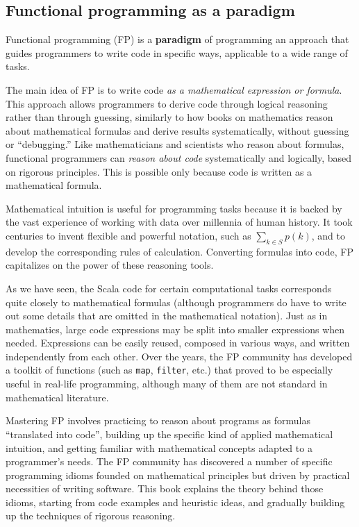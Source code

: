 \subsection{Functional programming as a paradigm}

Functional programming (FP)
is a \textbf{paradigm} of programming
\textemdash{} an approach that guides programmers to write code in
specific ways, applicable to a wide range of tasks.

The main idea of FP is to write code \emph{as a mathematical expression
or formula}. This approach allows programmers to derive code through
logical reasoning rather than through guessing, similarly to how books
on mathematics reason about mathematical formulas and derive results
systematically, without guessing or \textsf{``}debugging.\textsf{''} Like mathematicians
and scientists who reason about formulas, functional programmers can
\emph{reason about code} systematically and logically, based on rigorous
principles. This is possible only because code is written as a mathematical
formula.

Mathematical intuition is useful for programming tasks because it
is backed by the vast experience of working with data over millennia
of human history. It took centuries to invent flexible and powerful
notation, such as $\sum_{k\in S}p(k)$, and to develop the corresponding
rules of calculation. Converting formulas into code, FP capitalizes
on the power of these reasoning tools.

As we have seen, the Scala code for certain computational tasks corresponds
quite closely to mathematical formulas (although programmers do have
to write out some details that are omitted in the mathematical notation).
Just as in mathematics, large code expressions may be split into smaller
expressions when needed. Expressions can be easily reused, composed
in various ways, and written independently from each other. Over the
years, the FP community has developed a toolkit of functions (such
as \lstinline!map!, \texttt{}\lstinline!filter!, etc.) that proved
to be especially useful in real-life programming, although many of
them are not standard in mathematical literature.

Mastering FP involves practicing to reason about programs as formulas
\textsf{``}translated into code\textsf{''}, building up the specific kind of applied
mathematical intuition, and getting familiar with mathematical concepts
adapted to a programmer\textsf{'}s needs. The FP community has discovered a
number of specific programming idioms founded on mathematical principles
but driven by practical necessities of writing software. This book
explains the theory behind those idioms, starting from code examples
and heuristic ideas, and gradually building up the techniques of rigorous
reasoning.

